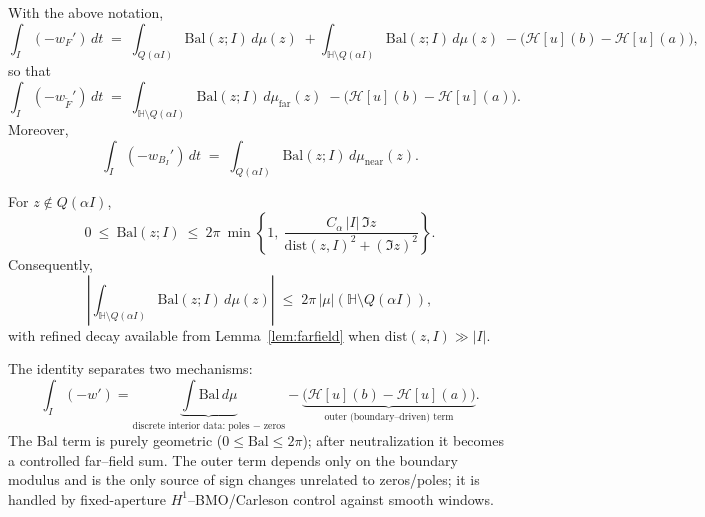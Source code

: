 \begin{corollary}\label{cor:neutralized}
With the above notation,
\[
\int_I (-w_F')\,dt
\;=\; \int_{Q(\alpha I)} \mathrm{Bal}(z;I)\,d\mu(z)
\;+
\int_{\mathbb{H}\setminus Q(\alpha I)} \mathrm{Bal}(z;I)\,d\mu(z)
\;-
\big(\mathcal{H}[u](b)-\mathcal{H}[u](a)\big),
\]
so that
\[
\int_I (-w_{\widetilde F}')\,dt
\;=\;\int_{\mathbb{H}\setminus Q(\alpha I)} \mathrm{Bal}(z;I)\,d\mu_{\mathrm{far}}(z)
\;-
\big(\mathcal{H}[u](b)-\mathcal{H}[u](a)\big).
\]
Moreover,
\[
\int_I(-w_{B_I}')\,dt\;=\;\int_{Q(\alpha I)} \mathrm{Bal}(z;I)\,d\mu_{\mathrm{near}}(z).
\]
\end{corollary}

\begin{lemma}\label{lem:uniform-bounds}
For $z\notin Q(\alpha I)$,
\[
0\ \le\ \mathrm{Bal}(z;I)\ \le\ 2\pi\ \min\!\left\{1,\ \frac{C_\alpha\,|I|\,\Im z}{\mathrm{dist}(z,I)^2+(\Im z)^2}\right\}.
\]
Consequently,
\[
\left|\int_{\mathbb{H}\setminus Q(\alpha I)} \mathrm{Bal}(z;I)\,d\mu(z)\right|
\;\le\; 2\pi\,|\mu|(\mathbb{H}\setminus Q(\alpha I)),
\]
with refined decay available from Lemma~\ref{lem:farfield} when $\mathrm{dist}(z,I)\gg |I|$.
\end{lemma}

\begin{remark}
The identity separates two mechanisms:
\[
\int_I (-w')= \underbrace{\int \mathrm{Bal}\,d\mu}_{\text{discrete interior data: poles $-$ zeros}} - \underbrace{\big(\mathcal{H}[u](b)-\mathcal{H}[u](a)\big)}_{\text{outer (boundary--driven) term}}.
\]
The Bal term is purely geometric ($0\le \mathrm{Bal}\le 2\pi$); after neutralization it becomes a controlled far--field sum. The outer term depends only on the boundary modulus and is the only source of sign changes unrelated to zeros/poles; it is handled by fixed-aperture $H^1$–BMO/Carleson control against smooth windows.
\end{remark}
